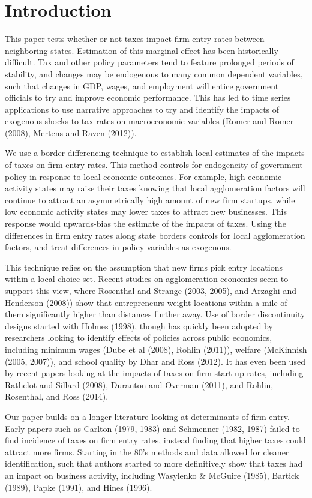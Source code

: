 
\section{Introduction} 

This paper tests whether or not taxes impact firm entry rates between neighboring states. Estimation of this marginal effect has been historically difficult. Tax and other policy parameters tend to feature prolonged periods of stability, and changes may be endogenous to many common dependent variables, such that changes in GDP, wages, and employment will entice government officials to try and improve economic performance. This has led to time series applications to use narrative approaches to try and identify the impacts of exogenous shocks to tax rates on macroeconomic variables (Romer and Romer (2008), Mertens and Raven (2012)). 

We use a border-differencing technique to establish local estimates of the impacts of taxes on firm entry rates. This method controls for endogeneity of government policy in response to local economic outcomes. For example, high economic activity states may raise their taxes knowing that local agglomeration factors will continue to attract an asymmetrically high amount of new firm startups, while low economic activity states may lower taxes to attract new businesses. This response would upwards-bias the estimate of the impacts of taxes. Using the differences in firm entry rates along state borders controls for local agglomeration factors, and treat differences in policy variables as exogenous.

This technique relies on the assumption that new firms pick entry locations within a local choice set. Recent studies on agglomeration economies seem to support this view, where Rosenthal and Strange (2003, 2005), and Arzaghi and Henderson (2008)) show that entrepreneurs weight locations within a mile of them significantly higher than distances further away. Use of border discontinuity designs started with Holmes (1998), though has quickly been adopted by researchers looking to identify effects of policies across public economics, including minimum wages (Dube et al (2008), Rohlin (2011)), welfare (McKinnish (2005, 2007)), and school quality by Dhar and Ross (2012). It has even been used by recent papers looking at the impacts of taxes on firm start up rates, including Rathelot and Sillard (2008), Duranton and Overman (2011), and Rohlin, Rosenthal, and Ross (2014).

Our paper builds on a longer literature looking at determinants of firm entry. Early papers such as Carlton (1979, 1983) and Schmenner (1982, 1987) failed to find incidence of taxes on firm entry rates, instead finding that higher taxes could attract more firms. Starting in the 80's methods and data  allowed for cleaner identification, such that authors started to more definitively show that taxes had an impact on business activity, including Wasylenko \& McGuire (1985), Bartick (1989), Papke (1991), and Hines (1996).

